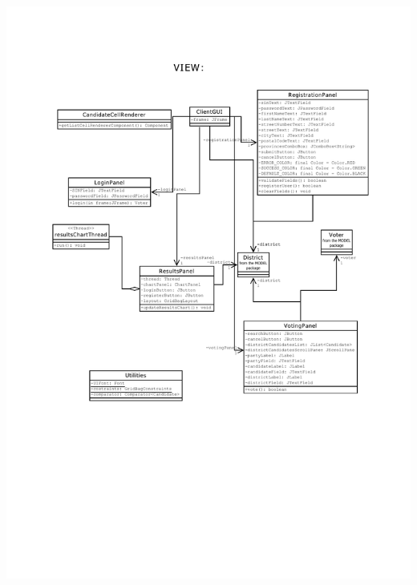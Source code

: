 \documentclass[11pt,english]{article}
\begin{document}
\includegraphics[width=6in]{figures/uml3.pdf}  \\ 
\newpage
\end{document}
